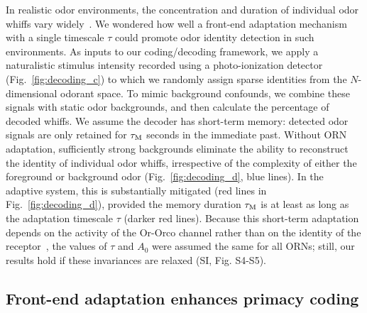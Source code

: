 \documentclass[9pt,twocolumn,twoside]{pnas-new}
\begin{document}
In realistic odor environments, the concentration and duration of individual odor whiffs vary widely~\cite{celani}. We wondered how well a front-end adaptation mechanism with a single timescale $\tau$ could promote odor identity detection in such environments. As inputs to our coding/decoding framework, we apply a naturalistic stimulus intensity recorded using a photo-ionization detector~\cite{srinivas_elife} (Fig.~\ref{fig:decoding_c}) to which we randomly assign sparse identities from the $N$-dimensional odorant space. To mimic background confounds, we combine these signals with static odor backgrounds, and then calculate the percentage of decoded whiffs. We assume the decoder has short-term memory: detected odor signals are only retained for $\tau_{\textup {M}}$ seconds in the immediate past. Without ORN adaptation, sufficiently strong backgrounds eliminate the ability to reconstruct the identity of individual odor whiffs, irrespective of the complexity of either the foreground or background odor (Fig.~\ref{fig:decoding_d}, blue lines). In the adaptive system, this is substantially mitigated (red lines in Fig.~\ref{fig:decoding_d}), provided the memory duration $\tau_{\textup {M}}$ is at least as long as the adaptation timescale $\tau$ (darker red lines). Because this short-term adaptation depends on the activity of the Or-Orco channel rather than on the identity of the receptor~\cite{nagel_wilson_biophysical,martelli,srinivas_elife}, the values of $\tau$ and $A_{0}$ were assumed the same for all ORNs; still, our results hold if these invariances are relaxed (SI, Fig. S4-S5). 





\subsection*{Front-end adaptation enhances primacy coding}
\end{document}
